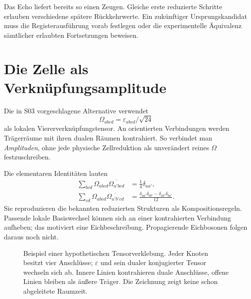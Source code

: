 Das Echo liefert bereits so einen Zeugen. Gleiche erste reduzierte Schritte erlauben verschiedene spätere Rückkehrwerte. Ein zukünftiger Ursprungskandidat muss die Registerausführung vorab festlegen oder die experimentelle Äquivalenz sämtlicher erlaubten Fortsetzungen beweisen.

\section{Die Zelle als Verknüpfungsamplitude}
Die in S03 vorgeschlagene Alternative verwendet
\begin{equation}
\Omega_{abcd}=\varepsilon_{abcd}/\sqrt{24}
\end{equation}
als lokalen Viererverknüpfungstensor. An orientierten Verbindungen werden Trägerräume mit ihren dualen Räumen kontrahiert. So verbindet man \emph{Amplituden}, ohne jede physische Zellreduktion als unverändert reines $\Omega$ festzuschreiben.

Die elementaren Identitäten lauten
\begin{align}
\sum_{bcd}\Omega_{abcd}\overline{\Omega_{a'bcd}}&=\frac14\delta_{aa'},\\
\sum_{cd}\Omega_{abcd}\overline{\Omega_{a'b'cd}}&=
\frac{\delta_{aa'}\delta_{bb'}-\delta_{ab'}\delta_{ba'}}{12}.
\end{align}
Sie reproduzieren die bekannten reduzierten Strukturen als Kompositionsregeln. Passende lokale Basiswechsel können sich an einer kontrahierten Verbindung aufheben; das motiviert eine Eichbeschreibung. Propagierende Eichbosonen folgen daraus noch nicht.

\begin{figure}[H]\centering
{}
\caption{Beispiel einer hypothetischen Tensorverklebung. Jeder Knoten besitzt vier Anschlüsse; $\varepsilon$ und sein dualer konjugierter Tensor wechseln sich ab. Innere Linien kontrahieren duale Anschlüsse, offene Linien bleiben als äußere Träger. Die Zeichnung zeigt keine schon abgeleitete Raumzeit.}
\end{figure}

